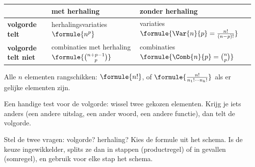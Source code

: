 \begin{theorie}
{\centering{}\renewcommand{\arraystretch}{1.9}%
\begin{tabular}{|>{\centering\arraybackslash}m{3.2cm}|>{\centering\arraybackslash}m{4.9cm}|>{\centering\arraybackslash}m{4.9cm}|}
\hline
 & \textbf{met herhaling} & \textbf{zonder herhaling} \\ \hline
\textbf{volgorde telt} & herhalingsvariaties \quad $\formule{n^p}$ & variaties \quad $\formule{\Var{n}{p} = \frac{n!}{(n - p)!}}$ \\ \hline
\textbf{volgorde telt niet} & combinaties met herhaling \quad $\formule{\binom{n + p - 1}{p}}$ & combinaties \quad $\formule{\Comb{n}{p} = \binom{n}{p}}$ \\ \hline
\end{tabular}\par}

\vspace{1mm}
Alle $n$ elementen rangschikken: $\formule{n!}$, of $\formule{\frac{n!}{n_1! \cdots n_k!}}$ als er gelijke elementen zijn.
\end{theorie}

Een handige test voor de volgorde: wissel twee gekozen elementen. Krijg je iets anders (een andere uitslag, een ander woord, een andere functie), dan telt de volgorde.

\begin{werkwijze}
Stel de twee vragen: volgorde? herhaling? Kies de formule uit het schema. Is de keuze ingewikkelder, splits ze dan in stappen (productregel) of in gevallen (somregel), en gebruik voor elke stap het schema.
\end{werkwijze}

\begin{oefeningen}
\end{oefeningen}

\opdrachtenkop

